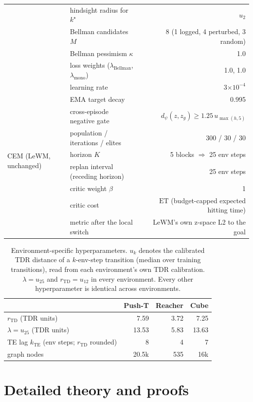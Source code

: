 \documentclass{article} %
\newcommand{\Htd}{r_{\mathrm{TD}}}
\newcommand{\ET}{\mathrm{ET}}
\newcommand{\dd}{d_{\psi}}
\theoremstyle{definition}
\theoremstyle{remark}
\begin{document}
\begin{table}[h]
\begin{tabular}{llr}
 & hindsight radius for $k^\star$ & $u_2$ \\
 & Bellman candidates $M$ & 8 (1 logged, 4 perturbed, 3 random) \\
 & Bellman pessimism $\kappa$ & 1.0 \\
 & loss weights ($\lambda_{\mathrm{Bellman}}$, $\lambda_{\mathrm{mono}}$) & 1.0, 1.0 \\
 & learning rate & 3$\times10^{-4}$ \\
 & EMA target decay & 0.995 \\
 & cross-episode negative gate & $\dd(z,z_g)\ge 1.25\,u_{\max(h,5)}$ \\
\midrule
\multirow{4}{*}{CEM (LeWM, unchanged)}
 & population / iterations / elites & 300 / 30 / 30 \\
 & horizon $K$ & 5 blocks $\Rightarrow$ 25 env steps \\
 & replan interval (receding horizon) & 25 env steps \\
\midrule
\multirow{3}{*}{Criterion (\cref{eq:compose})}
 & critic weight $\beta$ & 1 \\
 & critic cost & $\ET$ (budget-capped expected hitting time) \\
 & metric after the local switch & LeWM's own z-space L2 to the goal \\
\bottomrule
\end{tabular}
\end{table}

\begin{table}[h]
\centering\small
\caption{Environment-specific hyperparameters. $u_k$ denotes the calibrated TDR distance of a
$k$-env-step transition (median over training transitions), read from each environment's own TDR calibration.
$\lambda=u_{25}$ and $\Htd=u_{12}$ in every environment. Every other
hyperparameter is
identical across environments.}
\label{tab:hyper-env}
\begin{tabular}{lrrr}
\toprule
& Push-T & Reacher & Cube \\
\midrule
$\Htd$ (TDR units) & 7.59 & 3.72 & 7.25 \\
$\lambda=u_{25}$ (TDR units) & 13.53 & 5.83 & 13.63 \\
TE lag $k_{\mathrm{TE}}$ (env steps; $\Htd$ rounded) & 8 & 4 & 7 \\
graph nodes & 20.5k & 535 & 16k \\
\bottomrule
\end{tabular}
\end{table}
\section{Detailed theory and proofs}
\label{app:theory}
\end{document}
